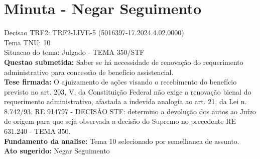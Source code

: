 \documentclass{article}
\begin{document}
\section*{Minuta - Negar Seguimento}
Decisao TRF2: TRF2-LIVE-5 (5016397-17.2024.4.02.0000)\\
Tema TNU: 10\\
Situacao do tema: Julgado - TEMA 350/STF\\
\textbf{Questao submetida:} Saber se há necessidade de renovação do requerimento administrativo para concessão de benefício assistencial.\\
\textbf{Tese firmada:} O ajuizamento de ações visando o recebimento do benefício previsto no art. 203, V, da Constituição Federal não exige a renovação bienal do requerimento administrativo, afastada a indevida analogia ao art. 21, da Lei n. 8.742/93. RE 914797 - DECISÃO STF: determino a devolução dos autos ao Juízo de origem para que seja observada a decisão do Supremo no precedente RE 631.240 - TEMA 350.\\
\textbf{Fundamento da analise:} Tema 10 selecionado por semelhanca de assunto.\\
\textbf{Ato sugerido:} Negar Seguimento
\end{document}
